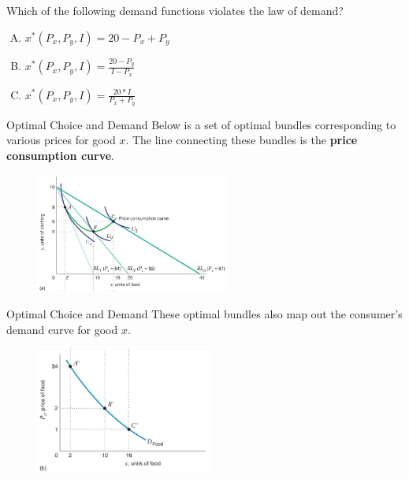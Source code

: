 \documentclass[12pt,t]{beamer}
\begin{document}
\begin{frame}

\bigskip
Which of the following demand functions violates the law of demand?

\bigskip
\begin{enumerate}[A)]
\item $x^*(P_x, P_y, I) = 20 -P_x +P_y$
\item $x^*(P_x, P_y, I) = \frac{20 - P_y}{I - P_x} $
\item $x^*(P_x, P_y, I) =  \frac{20*I}{P_x + P_y}$
\end{enumerate}
\end{frame}

\begin{frame}{Optimal Choice and Demand}
Below is a set of optimal bundles corresponding to various prices for good $x$. The line connecting these bundles is the \textbf{price consumption curve}.
\begin{figure}
  \includegraphics[width=240px]{figures/fig5_1a.jpg}
\end{figure}
\end{frame}

\begin{frame}{Optimal Choice and Demand}
These optimal bundles also map out the consumer's demand curve for good $x$.
\begin{figure}
  \includegraphics[width=220px]{figures/fig5_1b.jpg}
\end{figure}
\end{frame}
\end{document}
